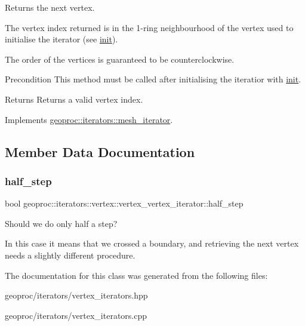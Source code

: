 Returns the next vertex. 

The vertex index returned is in the 1-\/ring neighbourhood of the vertex used to initialise the iterator (see \hyperlink{classgeoproc_1_1iterators_1_1vertex_1_1vertex__vertex__iterator_aa25d74c5f4067074ed6926a6d23800b4}{init}).

The order of the vertices is guaranteed to be counterclockwise.

\begin{DoxyPrecond}{Precondition}
This method must be called after initialising the iteratior with \hyperlink{classgeoproc_1_1iterators_1_1vertex_1_1vertex__vertex__iterator_aa25d74c5f4067074ed6926a6d23800b4}{init}. 
\end{DoxyPrecond}
\begin{DoxyReturn}{Returns}
Returns a valid vertex index. 
\end{DoxyReturn}


Implements \hyperlink{classgeoproc_1_1iterators_1_1mesh__iterator_a32f1ddc2f83743a2b0a4633506601cfe}{geoproc\+::iterators\+::mesh\+\_\+iterator}.



\subsection{Member Data Documentation}
\mbox{\label{classgeoproc_1_1iterators_1_1vertex_1_1vertex__vertex__iterator_a3e22144ee36c4739d316aca005e17d87}} 
\subsubsection{\texorpdfstring{half\+\_\+step}{half\_step}}
{\footnotesize\ttfamily bool geoproc\+::iterators\+::vertex\+::vertex\+\_\+vertex\+\_\+iterator\+::half\+\_\+step\hspace{0.3cm}{\ttfamily [private]}}



Should we do only half a step? 

In this case it means that we crossed a boundary, and retrieving the next vertex needs a slightly different procedure. 

The documentation for this class was generated from the following files\+:\begin{DoxyCompactItemize}
\item 
geoproc/iterators/vertex\+\_\+iterators.\+hpp\item 
geoproc/iterators/vertex\+\_\+iterators.\+cpp\end{DoxyCompactItemize}
